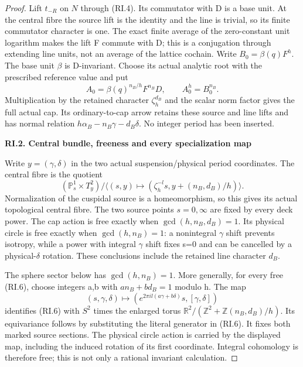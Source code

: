 \begin{proof}
Lift \(t_{-R}\) on \(N\) through (RI.4). Its commutator with D is a base unit.
At the central fibre the source lift is the identity and the line is
trivial, so its finite commutator character is one. The exact finite
average of the zero-constant unit logarithm makes the lift F commute
with D; this is a conjugation through extending line units, not an
average of the lattice cochain. Write \(B_0=\beta(q)F^h\). The base unit
\(\beta\) is D-invariant. Choose its actual analytic root with the prescribed
reference value and put
\[
 A_0=\beta(q)^{n_B/h}F^{n_B}D,\qquad A_0^h=B_0^{n_B}.
                                                               \tag{RI.5}
\]
Multiplication by the retained character \(\zeta_h^{d_B}\) and the scalar
norm factor gives the full actual cap. Its ordinary-to-cap arrow
retains these source and line lifts and has normal relation
\(h\alpha_B-n_B\gamma-d_B\delta\). No integer period has been inserted.

\par

\medskip\noindent\textbf{RI.2. Central bundle, freeness and every specialization map}

\par\nobreak

Write \(y=(\gamma,\delta)\) in the two actual suspension/physical period
coordinates. The central fibre is the quotient
\[
 (\mathbb P^1_s\times T^2_y)/\langle
       (s,y)\longmapsto(\zeta_h^{-l}s,
                        y+(n_B,d_B)/h)\rangle.          \tag{RI.6}
\]
Normalization of the cuspidal source is a homeomorphism, so this gives
its actual topological central fibre. The two source points \(s=0,\infty\)
are fixed by every deck power. The cap action is free exactly when
\(\gcd(h,n_B,d_B)=1\). Its physical circle is free exactly when \(\gcd(h,n_B)=1\):
a nonintegral \(\gamma\) shift prevents isotropy, while a power with integral
\(\gamma\) shift fixes s=0 and can be cancelled by a physical-\(\delta\) rotation.
These conclusions include the retained line character \(d_B\).

The sphere sector below has \(\gcd(h,n_B)=1\). More generally, for every
free (RI.6), choose integers a,b with \(a n_B+b d_B=1\) modulo h. The map
\[
 (s,\gamma,\delta)\longmapsto
 \left(e^{2\pi i l(a\gamma+b\delta)}s,
              [\gamma,\delta]\right)                  \tag{RI.7}
\]
identifies (RI.6) with \(S^2\) times the enlarged torus
\(\mathbb R^2/(\mathbb Z^2+\mathbb Z(n_B,d_B)/h)\). Its equivariance follows by substituting the
literal generator in (RI.6). It fixes both marked source sections.
The physical circle action is carried by the displayed map, including
the induced rotation of its first coordinate. Integral cohomology is
therefore free; this is not only a rational invariant calculation.


\end{proof}

